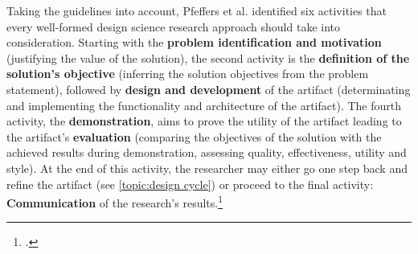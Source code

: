 Taking the guidelines into account, Pfeffers et al. identified six activities that every well-formed design science research approach should take into consideration. Starting with the \textbf{problem identification and motivation} (justifying the value of the solution), the second activity is the \textbf{definition of the solution's objective} (inferring the solution objectives from the problem statement), followed by \textbf{design and development} of the artifact (determinating and implementing the functionality and architecture of the artifact). The fourth activity, the \textbf{demonstration}, aims to prove the utility of the artifact leading to the artifact's \textbf{evaluation} (comparing the objectives of the solution with the achieved results during demonstration, assessing quality, effectiveness, utility and style). At the end of this activity, the researcher may either go one step back and refine the artifact (see \ref{topic:design cycle}) or proceed to the final activity: \textbf{Communication} of the research's results.\footcite[Cf.][pp.12 et seq]{PfeffersDesignScienceResearch2007}


